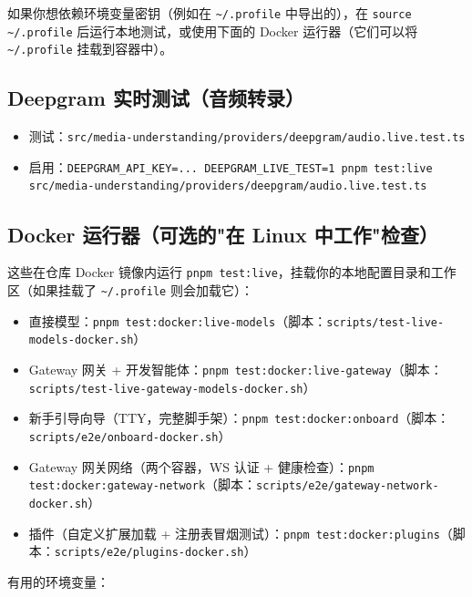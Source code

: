 如果你想依赖环境变量密钥（例如在 \texttt{\textasciitilde{}/.profile} 中导出的），在 \texttt{source \textasciitilde{}/.profile} 后运行本地测试，或使用下面的 Docker 运行器（它们可以将 \texttt{\textasciitilde{}/.profile} 挂载到容器中）。

\subsection{Deepgram 实时测试（音频转录）}


\begin{itemize}
  \item 测试：\texttt{src/media-understanding/providers/deepgram/audio.live.test.ts}
  \item 启用：\texttt{DEEPGRAM\_API\_KEY=... DEEPGRAM\_LIVE\_TEST=1 pnpm test:live src/media-understanding/providers/deepgram/audio.live.test.ts}
\end{itemize}


\subsection{Docker 运行器（可选的"在 Linux 中工作"检查）}


这些在仓库 Docker 镜像内运行 \texttt{pnpm test:live}，挂载你的本地配置目录和工作区（如果挂载了 \texttt{\textasciitilde{}/.profile} 则会加载它）：

\begin{itemize}
  \item 直接模型：\texttt{pnpm test:docker:live-models}（脚本：\texttt{scripts/test-live-models-docker.sh}）
  \item Gateway 网关 + 开发智能体：\texttt{pnpm test:docker:live-gateway}（脚本：\texttt{scripts/test-live-gateway-models-docker.sh}）
  \item 新手引导向导（TTY，完整脚手架）：\texttt{pnpm test:docker:onboard}（脚本：\texttt{scripts/e2e/onboard-docker.sh}）
  \item Gateway 网关网络（两个容器，WS 认证 + 健康检查）：\texttt{pnpm test:docker:gateway-network}（脚本：\texttt{scripts/e2e/gateway-network-docker.sh}）
  \item 插件（自定义扩展加载 + 注册表冒烟测试）：\texttt{pnpm test:docker:plugins}（脚本：\texttt{scripts/e2e/plugins-docker.sh}）
\end{itemize}


有用的环境变量：

